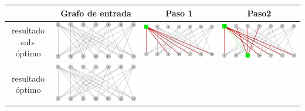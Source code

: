 	\begin{center}
		\begin{tabular}{ |c||c||c||c| }
		\hline
		& Grafo de entrada & Paso 1 & Paso2 \\
		\hline\hline
		resultado sub-\'optimo & 
		\includegraphics[scale = 0.18]{img/ej3/constructiva_golosa/bipartito2_st0.png} &
		\includegraphics[scale = 0.18]{img/ej3/constructiva_golosa/bipartito2_st01.png} &
		\includegraphics[scale = 0.18]{img/ej3/constructiva_golosa/bipartito2_st02.png} \\
		\hline
		resultado \'optimo&
		\includegraphics[scale = 0.18]{img/ej3/constructiva_golosa/bipartito2_st0.png} &

\end{tabular}
\end{center}
